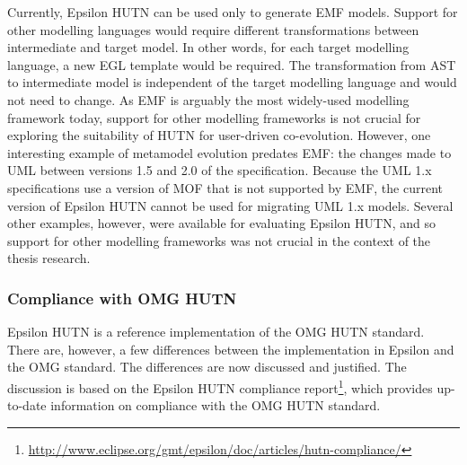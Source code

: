 Currently, Epsilon HUTN can be used only to generate EMF models. Support for other modelling languages would require different transformations between intermediate and target model. In other words, for each target modelling language, a new EGL template would be required. The transformation from AST to intermediate model is independent of the target modelling language and would not need to change. As EMF is arguably the most widely-used modelling framework today, support for other modelling frameworks is not crucial for exploring the suitability of HUTN for user-driven co-evolution. However, one interesting example of metamodel evolution predates EMF: the changes made to UML between versions 1.5 and 2.0 of the specification. Because the UML 1.x specifications use a version of MOF that is not supported by EMF, the current version of Epsilon HUTN cannot be used for migrating UML 1.x models. Several other examples, however, were available for evaluating Epsilon HUTN, and so support for other modelling frameworks was not crucial in the context of the thesis research.

\subsubsection{Compliance with OMG HUTN}
Epsilon HUTN is a reference implementation of the OMG HUTN standard. There are, however, a few differences between the implementation in Epsilon and the OMG standard. The differences are now discussed and justified. The discussion is based on the Epsilon HUTN compliance report\footnote{\url{http://www.eclipse.org/gmt/epsilon/doc/articles/hutn-compliance/}}, which provides up-to-date information on compliance with the OMG HUTN standard.

